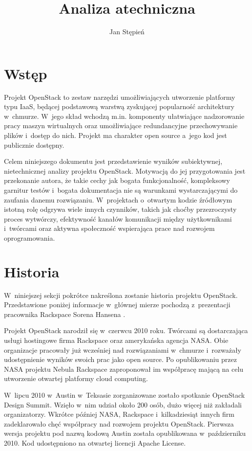 \documentclass[a4paper,12pt]{article}
\title{Analiza atechniczna}
\author{Jan Stępień}
\begin{document}
	\maketitle

	\section{Wstęp}

	Projekt OpenStack to zestaw narzędzi umożliwiających utworzenie platformy
	typu IaaS, będącej podstawową warstwą zyskującej popularność architektury
	w~chmurze. W~jego skład wchodzą m.in. komponenty ułatwiające nadzorowanie
	pracy maszyn wirtualnych oraz umożliwiające redundancyjne przechowywanie
	plików i~dostęp do nich. Projekt ma charakter open source a~jego kod jest
	publicznie dostępny.

	Celem niniejszego dokumentu jest przedstawienie wyników subiektywnej,
	nietechnicznej analizy projektu OpenStack. Motywacją do jej przygotowania
	jest przekonanie autora, że takie cechy jak bogata funkcjonalność,
	kompleksowy garnitur testów i~bogata dokumentacja nie są warunkami
	wystarczającymi do zaufania danemu rozwiązaniu. W~projektach o~otwartym
	kodzie źródłowym istotną rolę odgrywa wiele innych czynników, takich jak
	choćby przezroczysty proces wytwórczy, efektywność kanałów komunikacji
	między użytkownikami i~twórcami oraz aktywna społeczność wspierająca prace
	nad rozwojem oprogramowania.

	\section{Historia}

	W~niniejszej sekcji pokrótce nakreślona zostanie historia projektu
	OpenStack. Przedstawione poniżej informacje w~głównej mierze pochodzą
	z~prezentacji pracownika Rackspace Sorena Hansena \cite{hansen11}.

	Projekt OpenStack narodził się w~czerwcu 2010 roku. Twórcami są
	dostarczająca usługi hostingowe firma Rackspace oraz amerykańska agencja
	NASA. Obie organizacje pracowały już wcześniej nad rozwiązaniami w~chmurze
	i~rozważały udostępnienie wyników swoich prac jako open source. Po
	opublikowaniu przez NASA projektu Nebula Rackspace zaproponował im
	współpracę mającą na celu utworzenie otwartej platformy cloud computing.

	W~lipcu 2010 w~Austin w~Teksasie zorganizowane zostało spotkanie OpenStack
	Design Summit. Wzięło w~nim udział około 200 osób, dużo więcej niż
	zakładali organizatorzy. Wkrótce później NASA, Rackspace i~kilkadziesiąt
	innych firm zadeklarowało chęć współpracy nad rozwojem projektu OpenStack.
	Pierwsza wersja projektu pod nazwą kodową Austin została opublikowana
	w~październiku 2010. Kod udostępniono na otwartej licencji Apache License.
\end{document}
